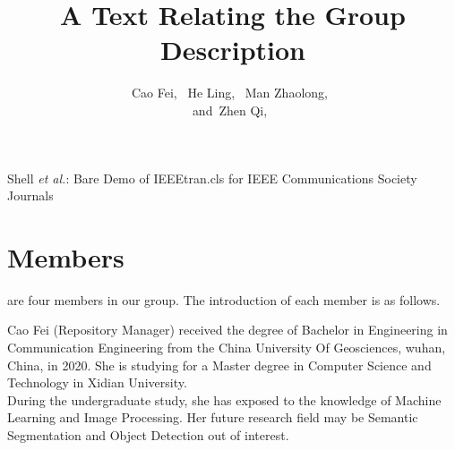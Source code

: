 \documentclass[journal,comsoc]{IEEEtran}
\begin{document}
\title{A Text Relating the Group Description}

\author{Cao Fei,~
     He Ling,~
    Man Zhaolong,~
   \\ and~Zhen Qi,~}
 
 
 
{Shell \MakeLowercase{\textit{et al.}}: Bare Demo of IEEEtran.cls for IEEE Communications Society Journals}


\maketitle

\IEEEpeerreviewmaketitle


\section{Members}
 are four members in our group. The introduction of each member is as follows.

\begin{IEEEbiography}{Cao Fei}
(Repository Manager) received the degree of  Bachelor in Engineering in Communication Engineering from the China University Of Geosciences, wuhan, China, in 2020. She is studying for a Master degree in Computer Science and Technology in Xidian University.\\
\hspace*{0.2cm}During the undergraduate study, she has exposed to the knowledge of Machine Learning and Image Processing. Her future research field may be Semantic Segmentation and Object Detection out of interest.
\end{IEEEbiography}
\end{document}
